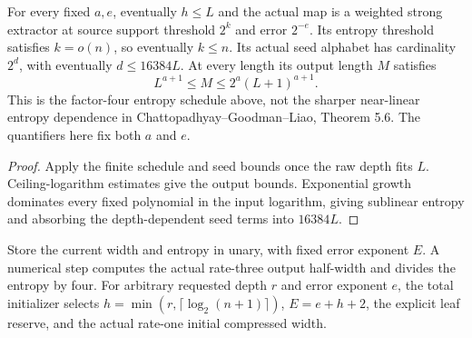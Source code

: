 \begin{theorem}
  \label{thm:lowerbounds-algebraic-polylog-extractor}
  \leanok
  For every fixed $a,e$, eventually $h\le L$ and the actual map is a
  weighted strong extractor at source support threshold $2^k$ and error
  $2^{-e}$. Its entropy threshold satisfies $k=o(n)$, so eventually $k\le n$.
  Its actual seed alphabet has cardinality $2^d$, with eventually
  $d\le16384L$. At every length its output length $M$ satisfies
  \[
    L^{a+1}\le M\le2^a(L+1)^{a+1}.
  \]
  This is the factor-four entropy schedule above, not the sharper
  near-linear entropy dependence in Chattopadhyay--Goodman--Liao,
  Theorem 5.6. The quantifiers here fix both $a$ and $e$.
\end{theorem}
\begin{proof}
  \leanok
  Apply the finite schedule and seed bounds once the raw depth fits $L$.
  Ceiling-logarithm estimates give the output bounds. Exponential growth
  dominates every fixed polynomial in the input logarithm, giving sublinear
  entropy and absorbing the depth-dependent seed terms into $16384L$.
\end{proof}

\begin{definition}
  \label{def:lowerbounds-algebraic-scheduled-state}
  \leanok
  Store the current width and entropy in unary, with fixed error exponent
  $E$. A numerical step computes the actual rate-three output half-width
  and divides the entropy by four. For arbitrary requested depth $r$ and
  error exponent $e$, the total initializer selects
  $h=\min(r,\lceil\log_2(n+1)\rceil)$, $E=e+h+2$, the explicit leaf
  reserve, and the actual rate-one initial compressed width.
\end{definition}


